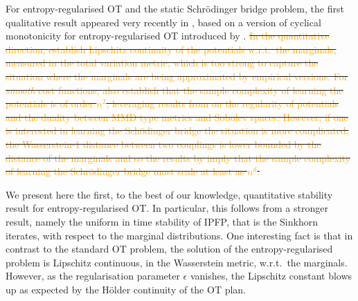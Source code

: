 \documentclass[11pt,a4paper]{article}
\providecommand{\DIFdeltex}[1]{{\protect\color{red}\sout{#1}}}                      %
\providecommand{\DIFdelbegin}{} %
\providecommand{\DIFdelend}{} %
\providecommand{\DIFdel}[1]{\texorpdfstring{\DIFdeltex{#1}}{}} %
\begin{document}
For entropy-regularised OT and the static Schr\"odinger bridge problem, the first qualitative result appeared very recently in \cite{ghosal2021stability}, based on a version of cyclical monotonicity for entropy-regularised OT introduced by \cite{bernton2021entropic}. \DIFdelbegin \DIFdel{\textcolor{orange}{In the quantitative direction, \cite{luise2019sinkhorn} establish Lipschitz continuity of the potentials w.r.t.\ the marginals, measured in the total variation metric, which is too strong to capture the situation where the marginals are being approximated by empirical versions. For \emph{smooth} cost functions, \cite{luise2019sinkhorn} also establish that the sample complexity of learning the potentials is of order $n^2$, leveraging results from \cite{genevay2019sample} on the regularity of potentials and the duality between MMD type metrics and Sobolev spaces. However, if one is interested in learning the Sch\"odinger bridge the situation is more complicated; 
the Wasserstein-1 distance between two couplings is lower bounded by the distance of the marginals and so the results by \cite{fournier2015rate} imply that the sample complexity of learning the Schr\"odinger bridge must scale at least as $n^{d}$.}
}%

\DIFdelend We present here the first, to the best of our knowledge, quantitative stability result for entropy-regularised OT. In particular, this follows from a stronger result, namely the uniform in time stability of IPFP, that is the Sinkhorn iterates, with respect to the marginal distributions. One interesting fact is that in contrast to the standard OT problem, the solution of the entropy-regularised problem is Lipschitz continuous, in the Wasserstein metric, w.r.t.\ the marginals. However, as the regularisation parameter $\epsilon$ vanishes, the Lipschitz constant blows up as expected by the H\"older continuity of the OT plan. 





\end{document}
